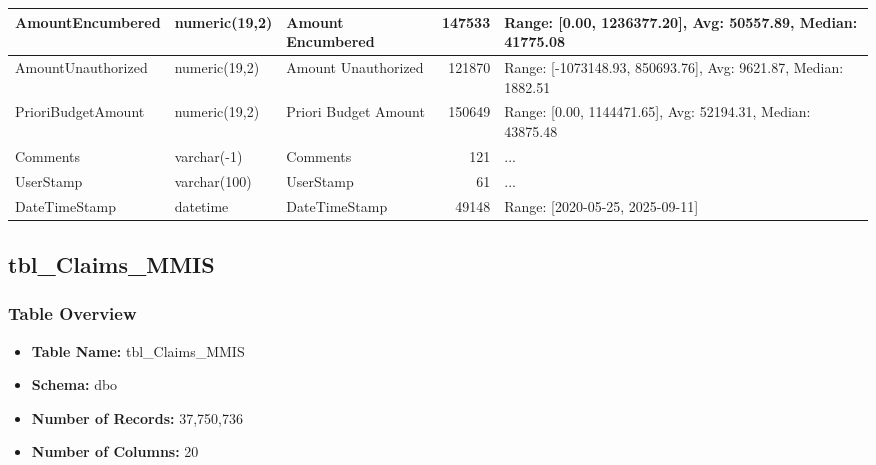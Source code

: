 \begin{landscape}
\begin{longtable}{|l|l|l|r|p{6cm}|}
\hline
AmountEncumbered & numeric(19,2) & Amount Encumbered & 147533 & Range: [0.00, 1236377.20], Avg: 50557.89, Median: 41775.08 \\
\hline
AmountUnauthorized & numeric(19,2) & Amount Unauthorized & 121870 & Range: [-1073148.93, 850693.76], Avg: 9621.87, Median: 1882.51 \\
\hline
PrioriBudgetAmount & numeric(19,2) & Priori Budget Amount & 150649 & Range: [0.00, 1144471.65], Avg: 52194.31, Median: 43875.48 \\
\hline
Comments & varchar(-1) & Comments & 121 & ... \\
\hline
UserStamp & varchar(100) & UserStamp & 61 & ... \\
\hline
DateTimeStamp & datetime & DateTimeStamp & 49148 & Range: [2020-05-25, 2025-09-11] \\
\hline
\end{longtable}

\subsection{tbl\_Claims\_MMIS}

\subsubsection{Table Overview}
\begin{itemize}
\item \textbf{Table Name:} tbl\_Claims\_MMIS
\item \textbf{Schema:} dbo
\item \textbf{Number of Records:} 37,750,736
\item \textbf{Number of Columns:} 20
\end{itemize}


\end{landscape}
